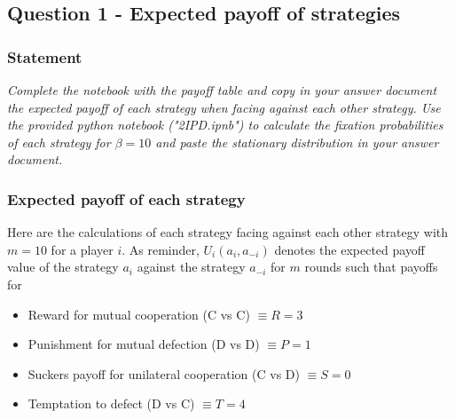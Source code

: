 \documentclass{article}
\begin{document}
\subsection{Question 1 - Expected payoff of strategies}

\subsubsection*{Statement}

\textit{Complete the notebook with the payoff table and copy in your answer	document the expected payoff of each strategy when facing	against	each other strategy. Use the provided python notebook ("2IPD.ipnb") to calculate the fixation probabilities of each strategy for $\beta = 10$ and paste the stationary distribution in your answer document.}

\subsubsection{Expected payoff of each strategy}
Here are the calculations of each strategy facing against each other strategy with $m = 10$ for a player $i$. As reminder, $U_{i}(a_{i},a_{-i})$ denotes the expected payoff value of the strategy $a_{i}$ against the strategy $a_{-i}$ for $m$ rounds such that payoffs for  
\begin{itemize}
\item Reward for mutual cooperation (C vs C) $\equiv R = 3$ 
\item Punishment for mutual defection (D vs D) $\equiv P = 1$
\item Suckers payoff for unilateral cooperation (C vs D) $\equiv S = 0$
\item Temptation to defect (D vs C) $\equiv T = 4$
\end{itemize}  
\end{document}
